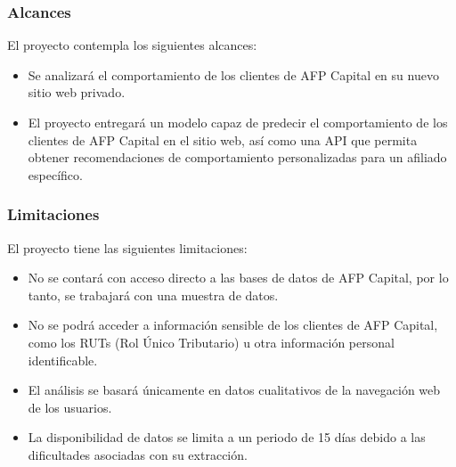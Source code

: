 \subsubsection{Alcances}

El proyecto contempla los siguientes alcances:

\begin{itemize}
\item Se analizará el comportamiento de los clientes de AFP Capital en su nuevo sitio web privado.
\item El proyecto entregará un modelo capaz de predecir el comportamiento de los clientes de AFP Capital en el sitio web, así como una API que permita obtener recomendaciones de comportamiento personalizadas para un afiliado específico.
\end{itemize}

\subsubsection{Limitaciones}

El proyecto tiene las siguientes limitaciones:

\begin{itemize}
\item No se contará con acceso directo a las bases de datos de AFP Capital, por lo tanto, se trabajará con una muestra de datos.
\item No se podrá acceder a información sensible de los clientes de AFP Capital, como los RUTs (Rol Único Tributario) u otra información personal identificable.
\item El análisis se basará únicamente en datos cualitativos de la navegación web de los usuarios.
\item La disponibilidad de datos se limita a un periodo de 15 días debido a las dificultades asociadas con su extracción.
\end{itemize}